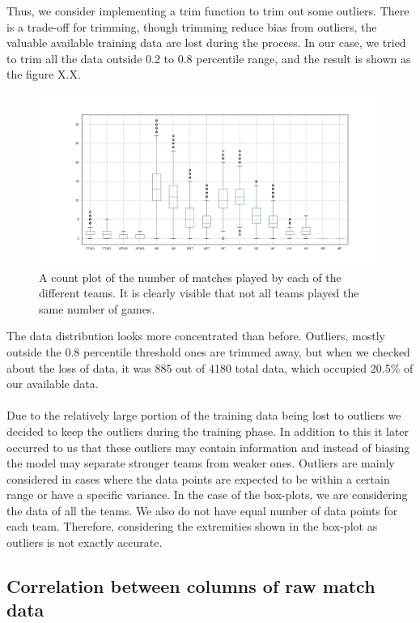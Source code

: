 \documentclass[a4paper,12pt]{article}
\begin{document}
	Thus, we consider implementing a trim function to trim out some outliers. There is a trade-off for trimming, though trimming reduce bias from outliers, the valuable available training data are lost during the process. In our case, we tried to trim all the data outside 0.2 to 0.8 percentile range, and the result is shown as the figure X.X.
	
	\begin{figure}[H]
		\renewcommand\thefigure{2.3}
		\centering
		
		\includegraphics[scale=0.4]{trimmed_box_plot.png}
		\caption{A count plot of the number of matches played by each of the different teams. It is clearly visible that not all teams played the same number of games.}
	\end{figure}
	
	The data distribution looks more concentrated than before. Outliers, mostly outside the 0.8 percentile threshold ones are trimmed away, but when we checked about the loss of data, it was 885 out of 4180 total data, which occupied 20.5\% of our available data.\\
	\\
	Due to the relatively large portion of the training data being lost to outliers we decided to keep the outliers during the training phase. In addition to this it later occurred to us that these outliers may contain information and instead of biasing the model may separate stronger teams from weaker ones. Outliers are mainly considered in cases where the data points are expected to be within a certain range or have a specific variance. In the case of the box-plots, we are considering the data of all the teams. We also do not have equal number of data points for each team. Therefore, considering the extremities shown in the box-plot as outliers is not exactly accurate.
	
	\subsection{Correlation between columns of raw match data }
	
\end{document}
